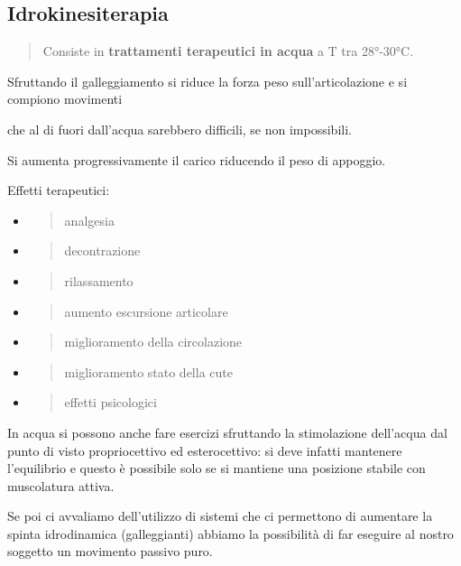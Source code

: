 \documentclass[]{article}
\begin{document}
\subsection{Idrokinesiterapia}\label{idrokinesiterapia}

\begin{quote}
Consiste in \textbf{trattamenti terapeutici in acqua} a T tra 28°-30°C.
\end{quote}

Sfruttando il galleggiamento si riduce la forza peso sull'articolazione
e si compiono movimenti

che al di fuori dall'acqua sarebbero difficili, se non impossibili.

Si aumenta progressivamente il carico riducendo il peso di appoggio.

Effetti terapeutici:

\begin{itemize}
\item
  \begin{quote}
  analgesia
  \end{quote}
\item
  \begin{quote}
  decontrazione
  \end{quote}
\item
  \begin{quote}
  rilassamento
  \end{quote}
\item
  \begin{quote}
  aumento escursione articolare
  \end{quote}
\item
  \begin{quote}
  miglioramento della circolazione
  \end{quote}
\item
  \begin{quote}
  miglioramento stato della cute
  \end{quote}
\item
  \begin{quote}
  effetti psicologici
  \end{quote}
\end{itemize}

In acqua si possono anche fare esercizi sfruttando la stimolazione
dell'acqua dal punto di visto propriocettivo ed esterocettivo: si deve
infatti mantenere l'equilibrio e questo è possibile solo se si mantiene
una posizione stabile con muscolatura attiva.

Se poi ci avvaliamo dell'utilizzo di sistemi che ci permettono di
aumentare la spinta idrodinamica (galleggianti) abbiamo la possibilità
di far eseguire al nostro soggetto un movimento passivo puro.
\end{document}
